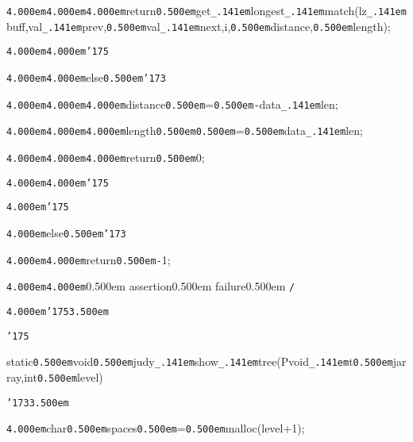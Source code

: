 \noindent
{}{\tt\mc \kern4.000em}{\tt\mc \kern4.000em}{\tt\mc \kern4.000em}return{\tt\mc \kern0.500em}get{\tt\_\kern.141em}longest{\tt\_\kern.141em}match(lz{\tt\_\kern.141em}buff,val{\tt\_\kern.141em}prev,{\tt\mc \kern0.500em}val{\tt\_\kern.141em}next,i,{\tt\mc \kern0.500em}distance,{\tt\mc \kern0.500em}length);

\noindent
{}{\tt\mc \kern4.000em}{\tt\mc \kern4.000em}{\tt\char'175}

\noindent
{}{\tt\mc \kern4.000em}{\tt\mc \kern4.000em}else{\tt\mc \kern0.500em}{\tt\char'173}

\noindent
{}{\tt\mc \kern4.000em}{\tt\mc \kern4.000em}{\tt\mc \kern4.000em}{\tt *}distance{\tt\mc \kern0.500em}={\tt\mc \kern0.500em}{\tt -}data{\tt\_\kern.141em}len;

\noindent
{}{\tt\mc \kern4.000em}{\tt\mc \kern4.000em}{\tt\mc \kern4.000em}{\tt *}length{\tt\mc \kern0.500em}{\tt\mc \kern0.500em}={\tt\mc \kern0.500em}data{\tt\_\kern.141em}len;

\noindent
{}{\tt\mc \kern4.000em}{\tt\mc \kern4.000em}{\tt\mc \kern4.000em}return{\tt\mc \kern0.500em}0;

\noindent
{}{\tt\mc \kern4.000em}{\tt\mc \kern4.000em}{\tt\char'175}

\noindent
{}{\tt\mc \kern4.000em}{\tt\char'175}

\noindent
{}{\tt\mc \kern4.000em}else{\tt\mc \kern0.500em}{\tt\char'173}

\noindent
{}{\tt\mc \kern4.000em}{\tt\mc \kern4.000em}return{\tt\mc \kern0.500em}{\tt -}1;

\noindent
{}{\tt\mc \kern4.000em}{\tt\mc \kern4.000em}\rm\mc {\tt /}{\tt *}\kern0.500em assertion\kern0.500em failure\kern0.500em {\tt *}{\tt /}
\tt\mc 

\noindent
{}{\tt\mc \kern4.000em}{\tt\char'175}{\tt\mc \kern3.500em}

\noindent
{}{\tt\char'175}

\noindent
{}\hfill

\noindent
{}\hfill

\noindent
{}static{\tt\mc \kern0.500em}void{\tt\mc \kern0.500em}judy{\tt\_\kern.141em}show{\tt\_\kern.141em}tree(Pvoid{\tt\_\kern.141em}t{\tt\mc \kern0.500em}jarray,int{\tt\mc \kern0.500em}level)

\noindent
{}{\tt\char'173}{\tt\mc \kern3.500em}

\noindent
{}{\tt\mc \kern4.000em}char{\tt *}{\tt\mc \kern0.500em}spaces{\tt\mc \kern0.500em}={\tt\mc \kern0.500em}malloc(level+1);

